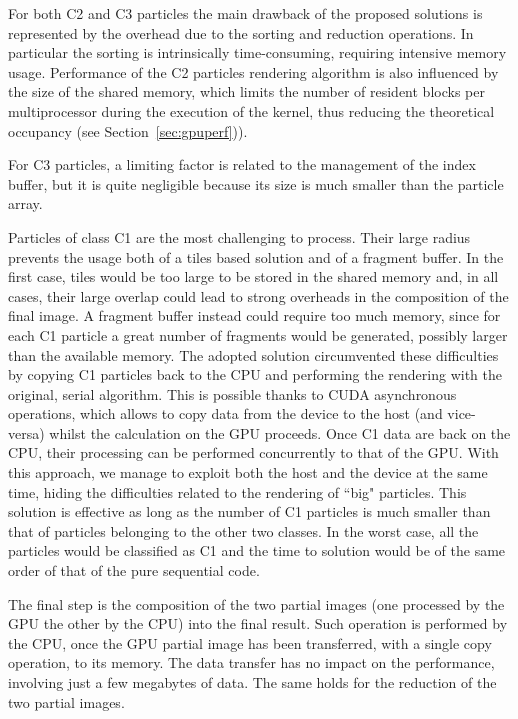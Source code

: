 \documentclass[1p]{elsarticle}
\begin{document}
For both C2 and C3 particles the main drawback of the proposed solutions 
is represented by the overhead due to the sorting and reduction operations. In particular the sorting 
is intrinsically time-consuming, requiring intensive memory usage. 
Performance of the C2 particles rendering algorithm is also influenced 
by the size of the shared memory, which limits the number of resident blocks
per multiprocessor during the execution of the kernel, thus reducing the theoretical
occupancy (see Section~\ref{sec:gpuperf})). 
 
For C3 particles, a limiting factor is related to the management of the index buffer, but it is quite negligible because its size is much smaller than the particle array.

Particles of class C1 are the most challenging to process. Their large 
radius prevents the usage both of a tiles based solution and of a fragment buffer.
In the first case, tiles would be too large to be stored in the shared memory
and, in all cases, their large overlap could lead to strong overheads in the composition of the 
final image. A fragment buffer instead could require too much memory, since 
for each C1 particle a great number of fragments would be generated, possibly
larger than the available memory. The adopted solution circumvented these 
difficulties by copying C1 particles back to the CPU and performing the rendering 
with the original, serial algorithm. This is possible thanks to CUDA asynchronous
operations, which allows to copy data from the device to the host (and vice-versa)
whilst the calculation on the GPU proceeds. Once C1 data are back on the CPU, 
their processing can be performed concurrently to that of the GPU.  
With this approach, we manage to exploit both the host and the device
at the same time, hiding the difficulties related to the rendering of ``big"
particles. This solution is effective as long as the number of C1 particles 
is much smaller than that of particles belonging to the other two classes. 
In the worst case, all the particles would be classified as C1 and the time to solution 
would be of the same order of that of the pure sequential code. 

The final step is the composition of the two partial images (one processed by the
GPU the other by the CPU) into the final result. 
Such operation is performed by the CPU, 
once the GPU partial image has been transferred, with a single copy operation, to
its memory. The data transfer has no impact on the performance, involving just a few 
megabytes of data. The same holds for the reduction of the two partial images.   
\end{document}
